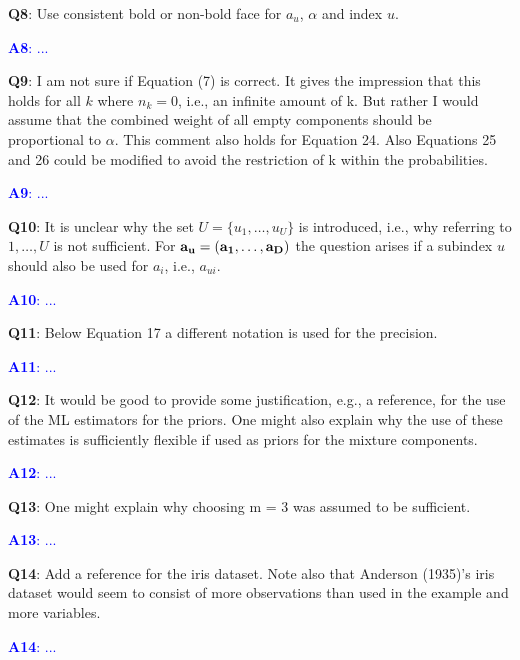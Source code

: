 \documentclass[]{article}
\begin{document}
		\vspace{3mm}
	\textbf{Q8}:  Use consistent bold or non-bold face for $a_u$, $\alpha$ and index $u$.

	\textcolor{blue}{  
	\textbf{A8}: ...
	} 
	
		\vspace{3mm}
	\textbf{Q9}: I am not sure if Equation (7) is correct. It gives the impression that this holds for all $k$ where $n_k = 0$, i.e., an infinite amount of k. But rather I would assume that the combined weight of all empty components should be proportional to $\alpha$. This comment also holds for Equation 24. Also Equations 25 and 26 could be modified to avoid the restriction of k within the probabilities.

	\textcolor{blue}{  
	\textbf{A9}: ...
	} 

	
	\vspace{3mm}
	\textbf{Q10}:  It is unclear why the set $U = \{u_1, \ldots, u_U\}$ is introduced, i.e., why referring to $1, \ldots, U$ is not sufficient. For $\bf{a}_u = (a_1, \ldots, a_D)$ the question arises if a subindex $u$ should also be used for $a_i$, i.e., $a_{ui}$.

	\textcolor{blue}{  
	\textbf{A10}: ...
	} 
	
	\vspace{3mm}
	\textbf{Q11}:  Below Equation 17 a different notation is used for the precision.

	\textcolor{blue}{  
	\textbf{A11}: ...
	} 

	
	\vspace{3mm}
	\textbf{Q12}: It would be good to provide some justification, e.g., a reference, for the use of the ML estimators for the priors. One might also explain why the use of these estimates is sufficiently flexible if used as priors for the mixture components.

	\textcolor{blue}{  
	\textbf{A12}: ...
	} 
	
	\vspace{3mm}
	\textbf{Q13}:  One might explain why choosing m = 3 was assumed to be sufficient.

	\textcolor{blue}{  
	\textbf{A13}: ...
	} 

	
	\vspace{3mm}
	\textbf{Q14}:  Add a reference for the iris dataset. Note also that Anderson (1935)'s iris dataset would seem to consist of more observations than used in the example and more variables.

	\textcolor{blue}{  
	\textbf{A14}: ...
	} 
	
\end{document}
